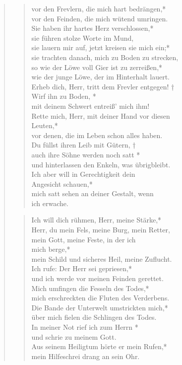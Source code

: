 \begin{quote}
\begin{verse}
vor den Frevlern, die mich hart bedrängen,*\\
vor den Feinden, die mich wütend umringen.\\ 
\vin Sie haben ihr hartes Herz verschlossen,*\\ \vin
sie führen stolze Worte im Mund,\\
sie lauern mir auf, jetzt kreisen sie mich ein;*\\
sie trachten danach, mich zu Boden zu strecken,\\ \vin
so wie der Löwe voll Gier ist zu zerreißen,*\\ \vin
wie der junge Löwe, der im Hinterhalt lauert.\\
Erheb dich, Herr, tritt dem Frevler entgegen! †\\
Wirf ihn zu Boden, *\\
mit deinem Schwert entreiß’ mich ihm!\\ \vin
Rette mich, Herr, mit deiner Hand vor diesen\\ \vin  Leuten,*\\ \vin
vor denen, die im Leben schon alles haben.\\
Du füllst ihren Leib mit Gütern, †\\
auch ihre Söhne werden noch satt *\\ 
und hinterlassen den Enkeln, was übrigbleibt.\\ \vin
Ich aber will in Gerechtigkeit dein \\ \vin Angesicht schauen,*\\ \vin
mich satt sehen an deiner Gestalt, wenn\\ \vin  ich erwache.\\

\end{verse}




\begin{verse}

\smallskip
Ich will dich rühmen, Herr, meine Stärke,*\\
Herr, du mein Fels, meine Burg, mein Retter,\\ \vin
mein Gott, meine Feste, in der ich\\ \vin  mich berge,*\\ \vin
mein Schild und sicheres Heil, meine Zuflucht.\\
Ich rufe: Der Herr sei gepriesen,*\\
und ich werde vor meinen Feinden gerettet.\\ \vin
Mich umfingen die Fesseln des Todes,*\\ \vin
mich erschreckten die Fluten des Verderbens.\\
Die Bande der Unterwelt umstrickten mich,*\\
über mich fielen die Schlingen des Todes.\\ \vin
In meiner Not rief ich zum Herrn *\\ \vin
und schrie zu meinem Gott.\\
Aus seinem Heiligtum hörte er mein Rufen,*\\
mein Hilfeschrei drang an sein Ohr.\\ \vin




\end{verse}
\end{quote}
